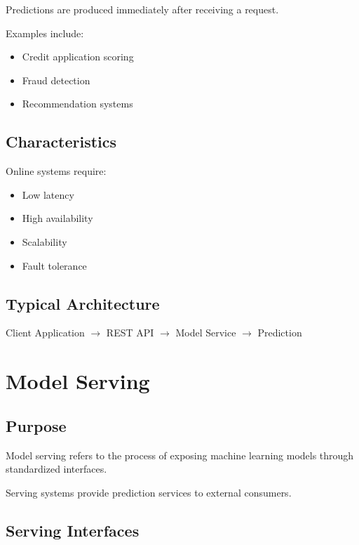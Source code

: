 Predictions are produced immediately after receiving a request.

Examples include:

\begin{itemize}
    \item Credit application scoring
    \item Fraud detection
    \item Recommendation systems
\end{itemize}

\subsection{Characteristics}

Online systems require:

\begin{itemize}
    \item Low latency
    \item High availability
    \item Scalability
    \item Fault tolerance
\end{itemize}

\subsection{Typical Architecture}

\begin{center}
Client Application
$\rightarrow$
REST API
$\rightarrow$
Model Service
$\rightarrow$
Prediction
\end{center}

\section{Model Serving}

\subsection{Purpose}

Model serving refers to the process of exposing machine learning models through standardized interfaces.

Serving systems provide prediction services to external consumers.

\subsection{Serving Interfaces}

